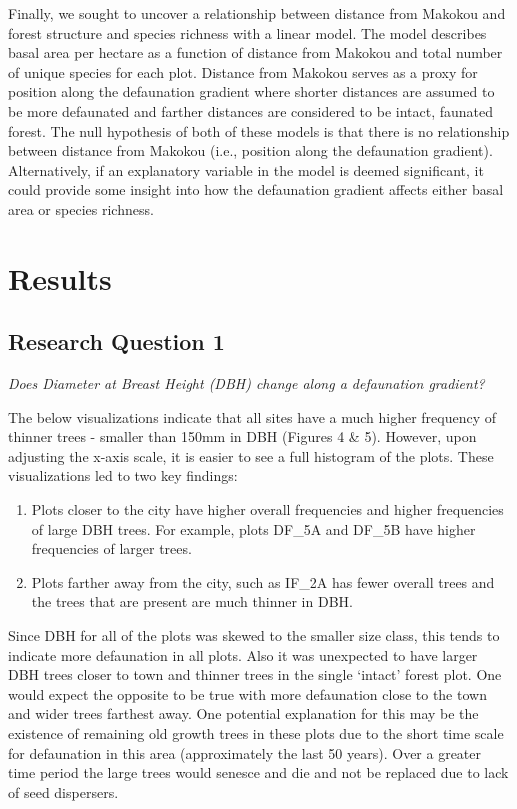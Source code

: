 \documentclass[
  12pt,
]{article}
\begin{document}
Finally, we sought to uncover a relationship between distance from
Makokou and forest structure and species richness with a linear model.
The model describes basal area per hectare as a function of distance
from Makokou and total number of unique species for each plot. Distance
from Makokou serves as a proxy for position along the defaunation
gradient where shorter distances are assumed to be more defaunated and
farther distances are considered to be intact, faunated forest. The null
hypothesis of both of these models is that there is no relationship
between distance from Makokou (i.e., position along the defaunation
gradient). Alternatively, if an explanatory variable in the model is
deemed significant, it could provide some insight into how the
defaunation gradient affects either basal area or species richness.

\hypertarget{results}{%
\section{Results}\label{results}}

\hypertarget{research-question-1-1}{%
\subsection{Research Question 1}\label{research-question-1-1}}

\emph{Does Diameter at Breast Height (DBH) change along a defaunation
gradient?}

The below visualizations indicate that all sites have a much higher
frequency of thinner trees - smaller than 150mm in DBH (Figures 4 \& 5).
However, upon adjusting the x-axis scale, it is easier to see a full
histogram of the plots. These visualizations led to two key findings:

\begin{enumerate}
\def\labelenumi{\arabic{enumi}.}
\item
  Plots closer to the city have higher overall frequencies and higher
  frequencies of large DBH trees. For example, plots DF\_5A and DF\_5B
  have higher frequencies of larger trees.
\item
  Plots farther away from the city, such as IF\_2A has fewer overall
  trees and the trees that are present are much thinner in DBH.
\end{enumerate}

Since DBH for all of the plots was skewed to the smaller size class,
this tends to indicate more defaunation in all plots. Also it was
unexpected to have larger DBH trees closer to town and thinner trees in
the single `intact' forest plot. One would expect the opposite to be
true with more defaunation close to the town and wider trees farthest
away. One potential explanation for this may be the existence of
remaining old growth trees in these plots due to the short time scale
for defaunation in this area (approximately the last 50 years). Over a
greater time period the large trees would senesce and die and not be
replaced due to lack of seed dispersers.
\end{document}
